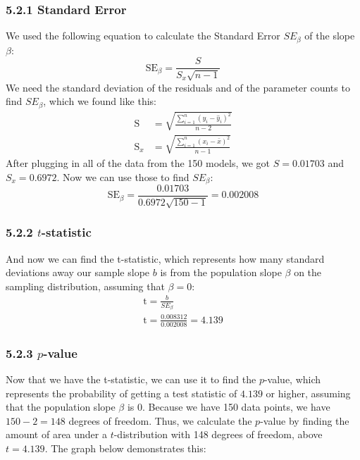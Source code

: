 \documentclass[12pt]{article}
\begin{document}
    \subsubsection*{5.2.1 Standard Error}

    We used the following equation to calculate the Standard Error $SE_\beta$ of the slope $\beta$:
    \[
        \mathrm{SE}_{\beta}
        =
        \frac{
            \displaystyle S
        }{
            \displaystyle S_x \sqrt{n - 1}
        }
    \]
    \noindent We need the standard deviation of the residuals and of the parameter counts to find $SE_\beta$, which we found like this:
    \begin{align*}
        \mathrm{S} &=
        \sqrt{
            \frac{
                \sum_{i=1}^n (y_i - \hat{y}_i)^2
            }{
                n - 2
            }
        } \\[1em]
        \mathrm{S}_x &=
        \sqrt{
            \frac{
                \sum_{i=1}^n (x_i - \bar{x})^2
            }{
                n - 1
            }
        }
    \end{align*}
    \noindent After plugging in all of the data from the 150 models, we got $S = 0.01703$ and $S_x = 0.6972$.
    Now we can use those to find $SE_\beta$:
    \[
        \mathrm{SE}_{\beta}
        =
        \frac{
            \displaystyle 0.01703
        }{
            \displaystyle 0.6972 \sqrt{150 - 1}
        }
        =
        0.002008
    \]

    \subsubsection*{5.2.2 $t$-statistic}
    \noindent And now we can find the t-statistic, which represents how many standard deviations away our sample slope $b$ is from the population slope $\beta$ on the sampling distribution, assuming that $\beta=0$:
    \begin{gather*}
        \mathrm{t} = \frac{b}{SE_\beta} \\[1em]
        \mathrm{t} = \frac{0.008312}{0.002008} = 4.139
    \end{gather*}

    \subsubsection*{5.2.3 $p$-value}
    \noindent Now that we have the t-statistic, we can use it to find the $p$-value, which represents the probability of getting a test statistic
    of $4.139$ or higher, assuming that the population slope $\beta$ is $0$. Because we have 150 data points, we have $150 - 2 = 148$ degrees of freedom.
    Thus, we calculate the $p$-value by finding the amount of area under a $t$-distribution with 148 degrees of freedom, above $t=4.139$. The graph below demonstrates this:
\end{document}
